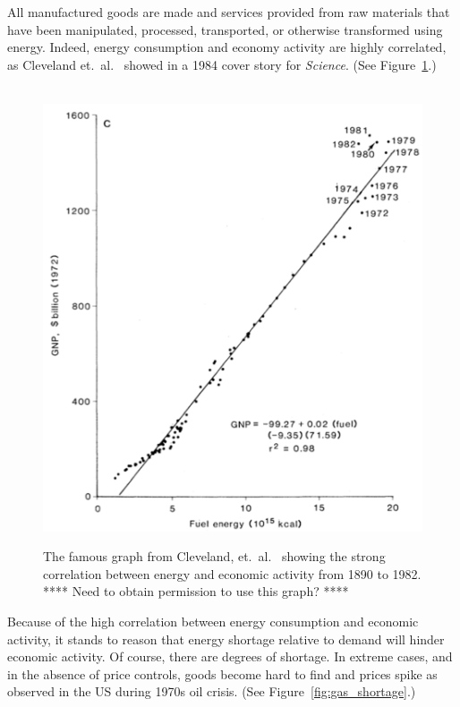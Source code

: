All manufactured goods are made and services provided
from raw materials that have been
manipulated, processed, transported, or otherwise transformed using energy.
Indeed, energy consumption and economy activity are highly correlated,
as Cleveland et.\ al.~\cite{Cleveland:1984aa} showed in a 1984 cover story for \emph{Science}. 
(See Figure~\ref{fig:Cleveland1984}.)

\begin{figure}[!ht]
\centering\
\includegraphics[width=\linewidth]{Part_0/Chapter_Introduction/images/Cleveland1984.pdf}
\caption[Energy and economic activity]{The famous graph from Cleveland, et.\ al.\
\cite{Cleveland:1984aa} showing the strong correlation 
between energy and economic activity from 1890 to 1982.
**** Need to obtain permission to use this graph? ****}
\label{fig:Cleveland1984}
\end{figure}

Because of the high correlation between energy consumption and economic activity,
it stands to reason that energy shortage relative to demand will hinder economic activity.
Of course, there are degrees of shortage. 
In extreme cases, and in the absence of price controls,
goods become hard to find and prices spike
as observed in the US during 1970s oil crisis.
(See Figure~\ref{fig:gas_shortage}.)

